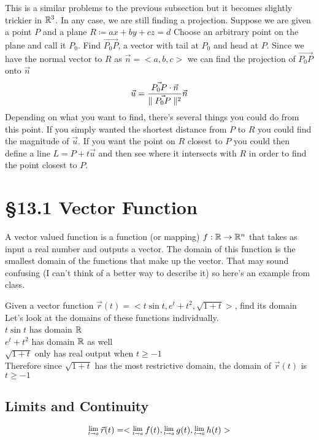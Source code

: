 \documentclass[12 pt]{article}
\begin{document}
		This is a similar problems to the previous subsection but it becomes slightly trickier in $\mathbb{R}^3$. In any case, we are still finding a projection. Suppose we are given a point $P$ and a plane $R\coloneqq ax+by+cz=d$ Choose an arbitrary point on the plane and call it $P_0$. Find $\vec{P_0P}$, a vector with tail at $P_0$ and head at $P$. Since we have the normal vector to $R$ as $\vec{n}=<a,b,c>$ we can find the projection of $\vec{P_0P}$ onto $\vec{n}$
		$$\vec{u}=\frac{\vec{P_0P}\cdot\vec{n}}{\parallel \vec{P_0P} \parallel^2}\vec{n}$$
		Depending on what you want to find, there's several things you could do from this point. If you simply wanted the shortest distance from $P$ to $R$ you could find the magnitude of $\vec{u}$. If you want the point on $R$ closest to $P$ you could then define a line $L=P+t\vec{u}$ and then see where it intersects with $R$ in order to find the point closest to $P$.

	\section{\S 13.1 Vector Function}

		A vector valued function is a function (or mapping) $f:\mathbb{R}\rightarrow\mathbb{R}^n$ that takes as input a real number and outputs a vector. The domain of this function is the smallest domain of the functions that make up the vector. That may sound confusing (I can't think of a better way to describe it) so here's an example from class.

		\begin{exmp*}
			Given a vector function $\vec{r}(t)=<t\sin{t},e^t+t^2,\sqrt{1+t}>$, find its domain\\
			Let's look at the domains of these functions individually.\\
			$t\sin{t}$ has domain $\mathbb{R}$\\
			$e^t+t^2$ has domain $\mathbb{R}$ as well\\
			$\sqrt{1+t}$ only has real output when $t\geq -1$\\
			Therefore since $\sqrt{1+t}$ has the most restrictive domain, the domain of $\vec{r}(t)$ is $t\geq -1$
		\end{exmp*}

		\subsection{Limits and Continuity}
		$$\Lim{t\rightarrow a}\vec{r}(t)=<\Lim{t\rightarrow a}f(t),\Lim{t\rightarrow a}g(t),\Lim{t\rightarrow a}h(t)>$$
\end{document}
